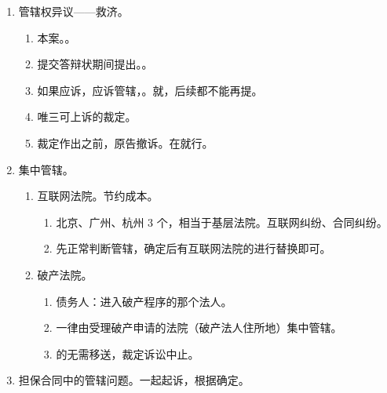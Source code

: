\begin{enumerate}
\begin{enumerate}
\begin{enumerate}
                  \item {} \yjt 争议双方 \yjt 两方高院（两次协商程序）\yjt 最高院。
                \end{enumerate}
          \item 管辖转移。上下级法院之间，对级别管辖的调整和。
                \begin{enumerate}
                  \item 上可以审下。搞不定、新类型等，下认为上审更合适。。
                  \item 上移下。。。
                \end{enumerate}
          \item {}。区分整成表格没有任何意义，抓。其实就是揪概念。
        \end{enumerate}
  \item 管辖权异议——救济。
        \begin{enumerate}
          \item 本案。。
          \item 提交答辩状期间提出。。
          \item 如果应诉，应诉管辖，。就，后续都不能再提。
          \item {}唯三可上诉的裁定。
          \item 裁定作出之前，原告撤诉。在就行。
        \end{enumerate}
  \item 集中管辖。
        \begin{enumerate}
          \item 互联网法院。节约成本。
                \begin{enumerate}
                  \item 北京、广州、杭州 3 个，相当于基层法院。互联网纠纷、合同纠纷。
                  \item 先正常判断管辖，确定后有互联网法院的进行替换即可。
                \end{enumerate}
          \item 破产法院。
                \begin{enumerate}
                  \item 债务人：进入破产程序的那个法人。
                  \item 一律由受理破产申请的法院（破产法人住所地）集中管辖。
                  \item {}的无需移送，裁定诉讼中止。
                \end{enumerate}
        \end{enumerate}
  \item 担保合同中的管辖问题。一起起诉，根据确定。
\end{enumerate}
